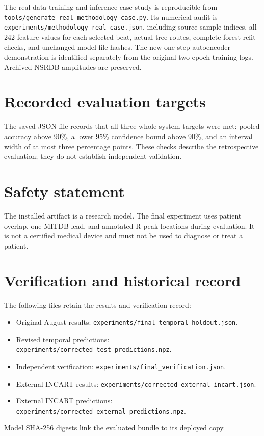 The real-data training and inference case study is reproducible from
\nolinkurl{tools/generate_real_methodology_case.py}. Its numerical audit is
\nolinkurl{experiments/methodology_real_case.json}, including source sample
indices, all 242 feature values for each selected beat, actual tree routes,
complete-forest refit checks, and unchanged model-file hashes. The new
one-step autoencoder demonstration is identified separately from the
original two-epoch training logs. Archived NSRDB amplitudes are preserved.

\section{Recorded evaluation targets}

The saved JSON file records that all three whole-system targets were met:
pooled accuracy above 90\%, a lower 95\% confidence bound above 90\%, and
an interval width of at most three percentage points. These checks describe
the retrospective evaluation; they do not establish independent validation.

\section{Safety statement}

The installed artifact is a research model. The final experiment uses patient
overlap, one MITDB lead, and annotated R-peak locations during evaluation. It
is not a certified medical device and must not be used to diagnose or treat a
patient.

\section{Verification and historical record}
The following files retain the results and verification record:
\begin{itemize}
\item Original August results:\newline
\nolinkurl{experiments/final_temporal_holdout.json}.
\item Revised temporal predictions:\newline
\nolinkurl{experiments/corrected_test_predictions.npz}.
\item Independent verification:\newline
\nolinkurl{experiments/final_verification.json}.
\item External INCART results:\newline
\nolinkurl{experiments/corrected_external_incart.json}.
\item External INCART predictions:\newline
\nolinkurl{experiments/corrected_external_predictions.npz}.
\end{itemize}
Model SHA-256 digests link the evaluated bundle to its deployed copy.

